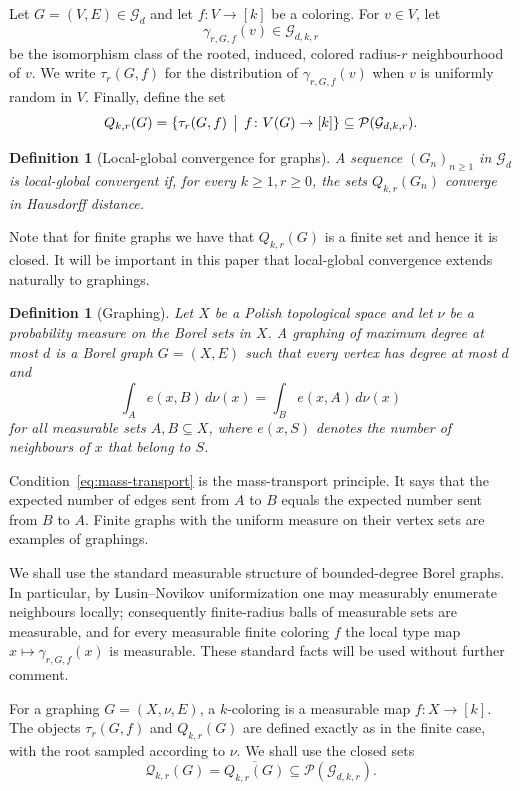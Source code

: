 \documentclass[11pt]{amsart}
\newcommand{\calG}{\mathcal G}
\newcommand{\calP}{\mathcal P}
\newcommand{\calQ}{\mathcal Q}
\newtheorem{definition}[theorem]{Definition}
\theoremstyle{remark}
\begin{document}
Let $G=(V,E)\in\calG_d$ and let $f\colon V\to[k]$ be a coloring.  For $v\in V$, let
\[
 \gamma_{r,G,f}(v)\in\calG_{d,k,r}
\]
be the isomorphism class of the rooted, induced, colored radius-$r$ neighbourhood of $v$.  We write $\tau_r(G,f)$ for the distribution of $\gamma_{r,G,f}(v)$ when $v$ is uniformly random in $V$.  Finally, define the set
\[
 Q_{k,r}(G)=\{\tau_r(G,f)\,\bigm|\,f\colon V(G)\to[k]\} \subseteq \calP(\calG_{d,k,r}).
\]

\begin{definition}[Local-global convergence for graphs]
A sequence $(G_n)_{n\geq 1}$ in $\calG_d$ is \emph{local-global convergent} if, for every $k\geq 1,r\geq 0$, the sets $Q_{k,r}(G_n)$ converge in Hausdorff distance.
\end{definition}

Note that for finite graphs we have that $Q_{k,r}(G)$ is a finite set and hence it is closed. It will be important in this paper that local-global convergence extends naturally to graphings.

\begin{definition}[Graphing]
Let $X$ be a Polish topological space and let $\nu$ be a probability measure on the Borel
sets in $X$. A \emph{graphing} of maximum degree at most $d$ is a Borel graph $G=(X,E)$ such that every vertex has degree at most $d$ and
\begin{equation}\label{eq:mass-transport}
 \int_A e(x,B)\,d\nu(x)=\int_B e(x,A)\,d\nu(x)
\end{equation}
for all measurable sets $A,B\subseteq X$, where $e(x,S)$ denotes the number of neighbours of $x$ that belong to $S$.
\end{definition}

Condition~\eqref{eq:mass-transport} is the mass-transport principle.  It says that the expected number of edges sent from $A$ to $B$ equals the expected number sent from $B$ to $A$.  Finite graphs with the uniform measure on their vertex sets are examples of graphings.

We shall use the standard measurable structure of bounded-degree Borel graphs.  In particular, by Lusin--Novikov uniformization \cite{KechrisCDST} one may measurably enumerate neighbours locally; consequently finite-radius balls of measurable sets are measurable, and for every measurable finite coloring $f$ the local type map $x\mapsto\gamma_{r,G,f}(x)$ is measurable.  These standard facts will be used without further comment.

For a graphing $G=(X,\nu,E)$, a $k$-coloring is a measurable map $f\colon X\to[k]$.  The objects $\tau_r(G,f)$ and $Q_{k,r}(G)$ are defined exactly as in the finite case, with the root sampled according to $\nu$.  We shall use the closed sets
\[
 \calQ_{k,r}(G)=\overline{Q_{k,r}(G)}\subseteq\calP(\calG_{d,k,r}).
\]
\end{document}
